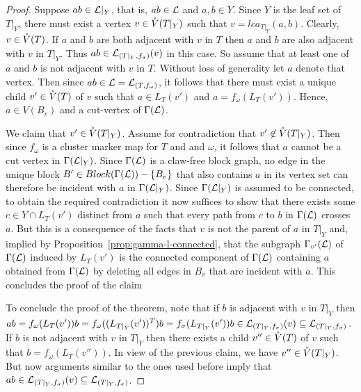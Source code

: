 \begin{proof}
Suppose $ab\in {\mathcal L}|_Y$, that is,  $ab\in{\mathcal L}$ and $a,b\in Y$. Since
$Y$ is the leaf set of $T|_Y$, there must exist a vertex $v\in \mathring{V}(T|_Y)$
such that $v=lca_{T|_Y}(a,b)$. Clearly, $v\in \mathring{V}(T)$. If $a$ and $b$
are both adjacent with $v$ in $T$ then $a$ and $b$ are also adjacent with $v$
in $T|_Y$. Thus $ab\in{\mathcal L}_{(T|_Y,f_{\sigma})}(v)$ in this case.
So assume that at least one of $a$ and $b$ is not adjacent with  $v$ in $T$.
Without loss of generality  let $a$ denote that vertex.
Then since $ab\in {\mathcal L}= {\mathcal L}_{(T,f_{\omega})}$, it follows that there 
must exist a unique child $v'\in \mathring{V}(T)$
of $v$ such that $a\in L_T(v')$ and $a=f_{\omega}(L_T(v'))$. Hence, $a\in V(B_v)$
and a cut-vertex of $\Gamma({\mathcal L})$. 

We claim that $v'\in \mathring{V}(T|_Y)$. Assume for contradiction that 
$v'\not\in \mathring{V}(T|_Y)$. Then since $f_{\omega}$ is a 
cluster marker map for $T$ and and $\omega$, it follows that 
$a$ cannot be a cut vertex in $\Gamma({\mathcal L}|_Y)$.
Since $\Gamma({\mathcal L})$ is a claw-free block graph, no edge in
the unique block $B'\in Block(\Gamma({\mathcal L}))-\{B_v\}$ that 
also contains $a$ in its vertex set can therefore be incident with $a$
in $\Gamma({\mathcal L}|_Y)$. Since $\Gamma({\mathcal L}|_Y)$ is assumed to be 
connected, to obtain the required contradiction it now 
suffices to show that there exists some $c\in Y\cap L_T(v')$
distinct from $a$
such that every path from $c$ to $b$ in $\Gamma({\mathcal L})$ crosses $a$.
But this is a consequence of the facts that $v$ is not the parent of $a$ 
in $T|_Y$ and, implied by Proposition~\ref{prop:gamma-l-connected}, that
the subgraph $\Gamma_{v'}({\mathcal L})$ of $\Gamma({\mathcal L})$ induced
by $L_T(v')$ is the connected component of $\Gamma({\mathcal L})$ containing
$a$ obtained from $\Gamma({\mathcal L})$ by deleting all edges in $B_v$ that
are incident with $a$. This concludes the proof of the claim

To conclude the proof of the theorem, note that if 
 $b$ is adjacent with $v$ in $T|_Y$ then
$ab= f_{\omega}(L_T(v'))b=f_{\omega}((L_{T|_Y}(v'))^T)b=
f_{\sigma}(L_{T|_Y}(v'))b\in{\mathcal L}_{(T|_Y,f_{\sigma})}(v)
\subseteq {\mathcal L}_{(T|_Y,f_{\sigma})}$.  If $b$ is not adjacent with $v$ in $T|_Y$
then there exists a child $v''\in \mathring{V}(T)$ of $v$ such that 
$b=f_{\omega}(L_T(v''))$.
In view of the previous claim,  we have $v''\in \mathring{V}(T|_Y)$.
But now arguments similar to the ones used before imply that
$ab\in {\mathcal L}_{(T|_Y,f_{\sigma})}(v)\subseteq {\mathcal L}_{(T|_Y,f_{\sigma})}$.
\qquad
\end{proof}


